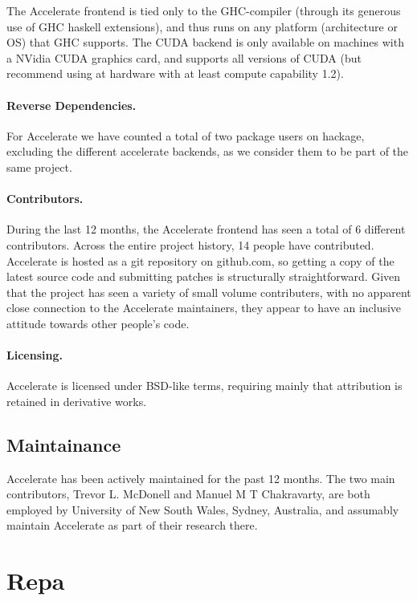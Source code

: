 The Accelerate frontend is tied only to the GHC-compiler (through its generous
use of GHC haskell extensions), and thus runs on any platform (architecture or
OS) that GHC supports.
The CUDA backend is only available on machines with a NVidia CUDA graphics
card, and supports all versions of CUDA (but recommend using at hardware with
at least compute capability 1.2).

\paragraph{Reverse Dependencies.} For Accelerate we have
counted a total of two package users on hackage, excluding the different
accelerate backends, as we consider them to be part of the same project.

\paragraph{Contributors.} During the last 12 months, the Accelerate
frontend has seen a total of 6 different contributors. Across the entire
project history, 14 people have contributed.
Accelerate is hosted as a git repository on github.com, so getting a copy of
the latest source code and submitting patches is structurally
straightforward.
Given that the project has seen a variety of small volume contributers, with no
apparent close connection to the Accelerate maintainers, they appear to have an
inclusive attitude towards other people's code.

\paragraph{Licensing.} Accelerate is licensed under BSD-like terms, requiring
mainly that attribution is retained in derivative works.

\subsection{Maintainance}

Accelerate has been actively maintained for the
past 12 months.
The two main contributors, Trevor L. McDonell and Manuel M
T Chakravarty, are both employed by University of New South Wales, Sydney,
Australia, and assumably maintain Accelerate as part of their research there.

\section{Repa}

